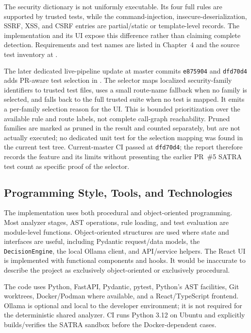 The security dictionary is not uniformly executable. Its four full rules are supported by trusted tests, while the command-injection, insecure-deserialization, SSRF, XSS, and CSRF entries are partial/static or template-level records. The implementation and its UI expose this difference rather than claiming complete detection. Requirements and test names are listed in Chapter~4 and the source test inventory at .

The later dedicated live-pipeline update at master commits \texttt{e875904} and \texttt{dfd70d4} adds PR-aware test selection in . The selector maps localized security-family identifiers to trusted test files, uses a small route-name fallback when no family is selected, and falls back to the full trusted suite when no test is mapped. It emits a per-family selection reason for the UI. This is bounded prioritization over the available rule and route labels, not complete call-graph reachability. Pruned families are marked as pruned in the result and counted separately, but are not actually executed; no dedicated unit test for the selection mapping was found in the current test tree. Current-master CI passed at \texttt{dfd70d4}; the report therefore records the feature and its limits without presenting the earlier PR~\#5 SATRA test count as specific proof of the selector.

\subsection{Programming Style, Tools, and Technologies}
The implementation uses both procedural and object-oriented programming. Most analyzer stages, AST operations, rule loading, and test evaluation are module-level functions. Object-oriented structures are used where state and interfaces are useful, including Pydantic request/data models, the \texttt{DecisionEngine}, the local Ollama client, and API/service helpers. The React UI is implemented with functional components and hooks. It would be inaccurate to describe the project as exclusively object-oriented or exclusively procedural.

The code uses Python, FastAPI, Pydantic, pytest, Python's AST facilities, Git worktrees, Docker/Podman where available, and a React/TypeScript frontend. Ollama is optional and local to the developer environment; it is not required for the deterministic shared analyzer. CI runs Python 3.12 on Ubuntu and explicitly builds/verifies the SATRA sandbox before the Docker-dependent cases.

